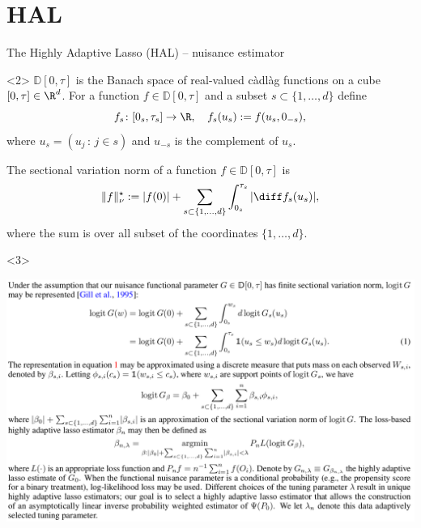 \documentclass[smaller]{beamer}\usepackage{listings}
\begin{document}
\section{HAL}
\label{sec:org529270c}
\begin{frame}[label={sec:org55ce46e}]{The Highly Adaptive Lasso (HAL) -- nuisance estimator}
\begin{onlyenv}<2>
\(\mathbb{D}[0, \tau]\) is the Banach space of real-valued càdlàg functions on a cube \([0,\tau]
   \in \R^d\). For a function \(f \in \mathbb{D}[0, \tau]\) and a subset \(s \subset \{1, \dots, d\}\)
define
\begin{equation*}
  f_s \colon [0_s, \tau_s] \rightarrow \R, \quad f_s(u_s) := f(u_s, 0_{-s}),
\end{equation*}
where \(u_s = (u_j \, : \, j \in s)\) and \(u_{-s}\) is the complement of \(u_s\). 

\vfill

The sectional variation norm of a function \(f \in \mathbb{D}[0, \tau]\) is
\begin{equation*}
  \Vert f \Vert_{\nu}^{\star} := |f(0)| + \sum_{s \subset \{1, \dots, d \}}\int_{0_s}^{\tau_s}  |\diff f_s(u_s)|,
\end{equation*}
where the sum is over all subset of the coordinates \(\{1, \dots, d\}\).
\end{onlyenv}

\begin{onlyenv}<3>
\begin{center}
\includegraphics[width=1.03\textwidth]{./screenshots/hal.png}
\end{center}
\end{onlyenv}
\end{frame}
\end{document}
